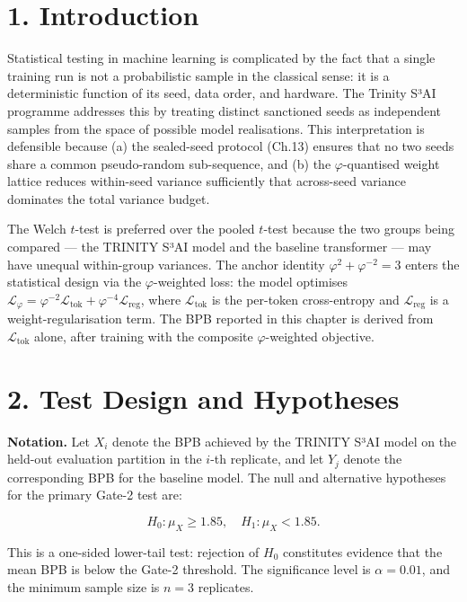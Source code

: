 \section{1. Introduction}\label{fa_19:introduction}

Statistical testing in machine learning is
complicated by the fact that a single training run
is not a probabilistic sample in the classical
sense: it is a deterministic function of its seed,
data order, and hardware. The Trinity S³AI
programme addresses this by treating distinct
sanctioned seeds as independent samples from the
space of possible model realisations. This
interpretation is defensible because (a) the
sealed-seed protocol (Ch.13) ensures that no two
seeds share a common pseudo-random sub-sequence,
and (b) the \(\varphi\)-quantised weight lattice
reduces within-seed variance sufficiently that
across-seed variance dominates the total variance
budget.

The Welch \(t\)-test is preferred over the pooled
\(t\)-test because the two groups being compared
--- the TRINITY S³AI model and the baseline
transformer --- may have unequal within-group
variances. The anchor identity
\(\varphi^2 + \varphi^{-2} = 3\) enters the
statistical design via the \(\varphi\)-weighted
loss: the model optimises
\(\mathcal{L}_\varphi = \varphi^{-2} \mathcal{L}_{\text{tok}} + \varphi^{-4} \mathcal{L}_{\text{reg}}\),
where \(\mathcal{L}_\text{tok}\) is the per-token
cross-entropy and \(\mathcal{L}_\text{reg}\) is a
weight-regularisation term. The BPB reported in
this chapter is derived from
\(\mathcal{L}_\text{tok}\) alone, after training
with the composite \(\varphi\)-weighted objective.

\section{2. Test Design and
Hypotheses}\label{fa_19:test-design-and-hypotheses}

\textbf{Notation.} Let \(X_i\) denote the BPB
achieved by the TRINITY S³AI model on the held-out
evaluation partition in the \(i\)-th replicate,
and let \(Y_j\) denote the corresponding BPB for
the baseline model. The null and alternative
hypotheses for the primary Gate-2 test are:

\[H_0: \mu_X \geq 1.85, \quad H_1: \mu_X < 1.85.\]

This is a one-sided lower-tail test: rejection of
\(H_0\) constitutes evidence that the mean BPB is
below the Gate-2 threshold. The significance level
is \(\alpha = 0.01\), and the minimum sample size
is \(n = 3\) replicates.

